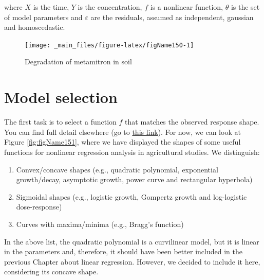 \documentclass[a4paper,12pt,oneside]{book}
\providecommand{\tightlist}{%
  \setlength{\itemsep}{0pt}\setlength{\parskip}{0pt}}
\begin{document}
where \(X\) is the time, \(Y\) is the concentration, \(f\) is a nonlinear function, \(\theta\) is the set of model parameters and \(\varepsilon\) are the residuals, assumed as independent, gaussian and homoscedastic.

\begin{figure}

{\centering \texttt{[image: \_main\_files/figure-latex/figName150-1]} 

}

\caption{Degradation of metamitron in soil}\label{fig:figName150}
\end{figure}

\hypertarget{model-selection}{%
\section{Model selection}\label{model-selection}}

The first task is to select a function \(f\) that matches the observed response shape. You can find full detail elsewhere (go to \href{https://www.statforbiology.com/2020/stat_nls_usefulfunctions/}{this link}). For now, we can look at Figure \ref{fig:figName151}, where we have displayed the shapes of some useful functions for nonlinear regression analysis in agricultural studies. We distinguish:

\begin{enumerate}
\def\labelenumi{\arabic{enumi}.}
\tightlist
\item
  Convex/concave shapes (e.g., quadratic polynomial, exponential growth/decay, asymptotic growth, power curve and rectangular hyperbola)
\item
  Sigmoidal shapes (e.g., logistic growth, Gompertz growth and log-logistic dose-response)
\item
  Curves with maxima/minima (e.g., Bragg's function)
\end{enumerate}

In the above list, the quadratic polynomial is a curvilinear model, but it is linear in the parameters and, therefore, it should have been better included in the previous Chapter about linear regression. However, we decided to include it here, considering its concave shape.
\end{document}
